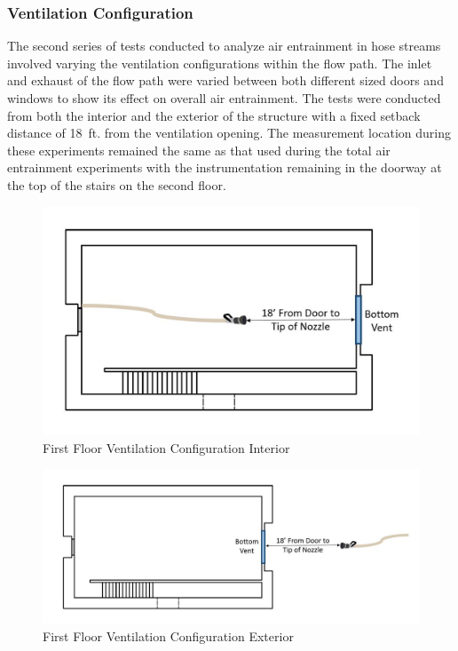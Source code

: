 \documentclass{article}
\begin{document}
\clearpage

\subsubsection{Ventilation Configuration}

The second series of tests conducted to analyze air entrainment in hose streams involved varying the ventilation configurations within the flow path. The inlet and exhaust of the flow path were varied between both different sized doors and windows to show its effect on overall air entrainment. The tests were conducted from both the interior and the exterior of the structure with a fixed setback distance of 18~ft. from the ventilation opening. The measurement location during these experiments remained the same as that used during the total air entrainment experiments with the instrumentation remaining in the doorway at the top of the stairs on the second floor.

\begin{figure}[!ht]
	\centering
	\includegraphics[width=5in]{Figures/Air_Entrainment/Measurement_Location_VentConfig_Bottom.jpg}
	\caption{First Floor Ventilation Configuration Interior}
	\label{fig:First_Floor_Ventilation_Configuration_Interior}
\end{figure}

\begin{figure}[!ht]
	\centering
	\includegraphics[width=6.5in]{Figures/Air_Entrainment/Measurement_Location_VentConfig_Bottom_Ext.jpg}
	\caption{First Floor Ventilation Configuration Exterior}
	\label{fig:First_Floor_Ventilation_Configuration_Exterior}
\end{figure}
\end{document}

